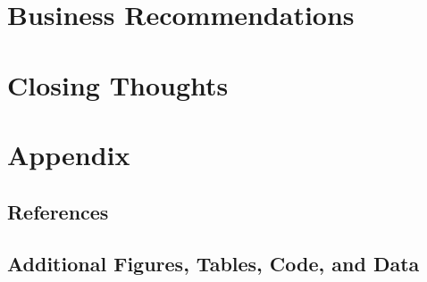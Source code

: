 \documentclass[12pt, a4paper]{book}
\begin{document}
\chapter{Business Recommendations}
\chapter{Closing Thoughts}
\chapter{Appendix}
	\section{References}
	\section{Additional Figures, Tables, Code, and Data}
\pagebreak


\nocite{*}

\end{document}
